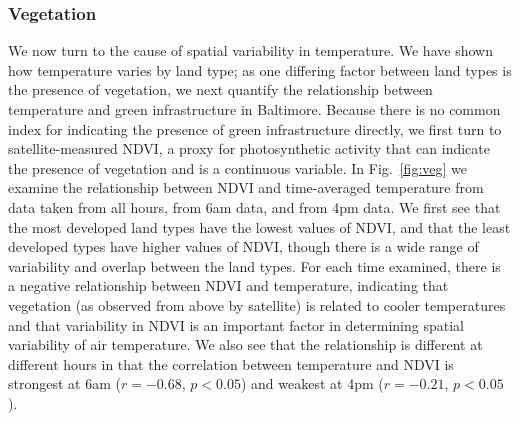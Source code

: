 \documentclass[draft,linenumbers]{agujournal}
\begin{document}
\subsubsection{Vegetation}
We now turn to the cause of spatial variability in temperature. We have shown how temperature varies by land type; as one differing factor between land types is the presence of vegetation, we next quantify the relationship between temperature and green infrastructure in Baltimore. 
Because there is no common index for indicating the presence of green infrastructure directly, we first turn to satellite-measured NDVI, a proxy for photosynthetic activity that can indicate the presence of vegetation and is a continuous variable. 
In Fig.~\ref{fig:veg} we examine the relationship between NDVI and time-averaged temperature from data taken from all hours, from 6am data, and from 4pm data. We first see that the most developed land types have the lowest values of NDVI, and that the least developed types have higher values of NDVI, though there is a wide range of variability and overlap between the land types. For each time examined, there is a negative relationship between NDVI and temperature, indicating that vegetation (as observed from above by satellite) is related to cooler temperatures and  that variability in NDVI is an important factor in determining spatial variability of air temperature. We also see that the relationship is different at different hours in that the correlation between temperature and NDVI is strongest at 6am ($r = -0.68$, $p< 0.05$) and weakest at 4pm ($r= -0.21$, $p<0.05$). 
\end{document}
